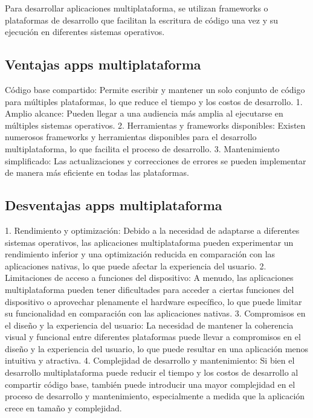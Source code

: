 \documentclass{article}
\begin{document}
\begin{multicols}{2}
		Para desarrollar aplicaciones multiplataforma, se utilizan frameworks o plataformas de desarrollo que facilitan la escritura de código una vez y su ejecución en diferentes sistemas operativos. 
		
		
		\subsection{Ventajas apps multiplataforma}
		Código base compartido: Permite escribir y mantener un solo conjunto de código para múltiples plataformas, lo que reduce el tiempo y los costos de desarrollo.
		1. Amplio alcance: Pueden llegar a una audiencia más amplia al ejecutarse en múltiples sistemas operativos.
		2. Herramientas y frameworks disponibles: Existen numerosos frameworks y herramientas disponibles para el desarrollo multiplataforma, lo que facilita el proceso de desarrollo.
		3. Mantenimiento simplificado: Las actualizaciones y correcciones de errores se pueden implementar de manera más eficiente en todas las plataformas.
		
		\subsection{Desventajas apps multiplataforma}
		
		1. Rendimiento y optimización: Debido a la necesidad de adaptarse a diferentes sistemas operativos, las aplicaciones multiplataforma pueden experimentar un rendimiento inferior y una optimización reducida en comparación con las aplicaciones nativas, lo que puede afectar la experiencia del usuario.
		2. Limitaciones de acceso a funciones del dispositivo: A menudo, las aplicaciones multiplataforma pueden tener dificultades para acceder a ciertas funciones del dispositivo o aprovechar plenamente el hardware específico, lo que puede limitar su funcionalidad en comparación con las aplicaciones nativas.
		3. Compromisos en el diseño y la experiencia del usuario: La necesidad de mantener la coherencia visual y funcional entre diferentes plataformas puede llevar a compromisos en el diseño y la experiencia del usuario, lo que puede resultar en una aplicación menos intuitiva y atractiva.
		4. Complejidad de desarrollo y mantenimiento: Si bien el desarrollo multiplataforma puede reducir el tiempo y los costos de desarrollo al compartir código base, también puede introducir una mayor complejidad en el proceso de desarrollo y mantenimiento, especialmente a medida que la aplicación crece en tamaño y complejidad.
		

\end{multicols}
\end{document}
